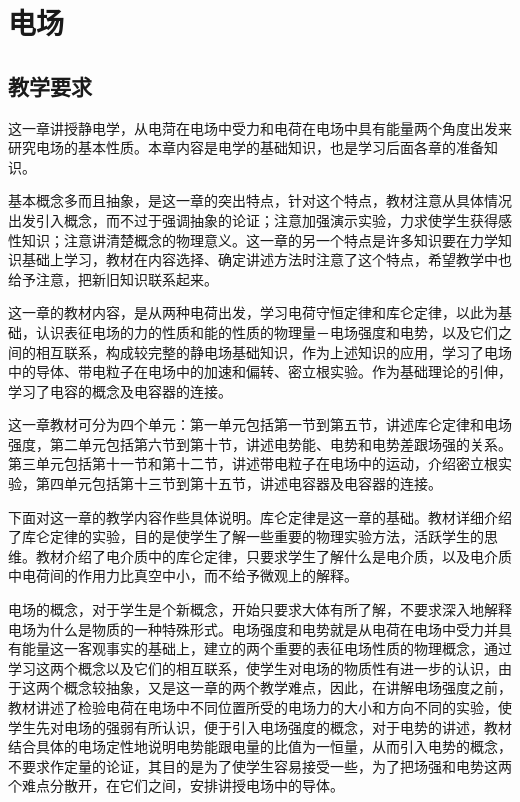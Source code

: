 \chapter{电场}\minitoc[n]
\section{教学要求}
这一章讲授静电学，从电菏在电场中受力和电荷在电场中具有能量两个角度出发来研究电场的基本性质。本章内容是电学的基础知识，也是学习后面各章的准备知识。

基本概念多而且抽象，是这一章的突出特点，针对这个特点，教材注意从具体情况出发引入概念，而不过于强调抽象的论证；注意加强演示实验，力求使学生获得感性知识；注意讲清楚概念的物理意义。这一章的另一个特点是许多知识要在力学知识基础上学习，教材在内容选择、确定讲述方法时注意了这个特点，希望教学中也给予注意，把新旧知识联系起来。

这一章的教材内容，是从两种电荷出发，学习电荷守恒定律和库仑定律，以此为基础，认识表征电场的力的性质和能的性质的物理量－电场强度和电势，以及它们之间的相互联系，构成较完整的静电场基础知识，作为上述知识的应用，学习了电场中的导体、带电粒子在电场中的加速和偏转、密立根实验。作为基础理论的引伸，学习了电容的概念及电容器的连接。

这一章教材可分为四个单元：第一单元包括第一节到第五节，讲述库仑定律和电场强度，第二单元包括第六节到第十节，讲述电势能、电势和电势差跟场强的关系。第三单元包括第十一节和第十二节，讲述带电粒子在电场中的运动，介绍密立根实验，第四单元包括第十三节到第十五节，讲述电容器及电容器的连接。

下面对这一章的教学内容作些具体说明。库仑定律是这一章的基础。教材详细介绍了库仑定律的实验，目的是使学生了解一些重要的物理实验方法，活跃学生的思维。教材介绍了电介质中的库仑定律，只要求学生了解什么是电介质，以及电介质中电荷间的作用力比真空中小，而不给予微观上的解释。

电场的概念，对于学生是个新概念，开始只要求大体有所了解，不要求深入地解释电场为什么是物质的一种特殊形式。电场强度和电势就是从电荷在电场中受力并具有能量这一客观事实的基础上，建立的两个重要的表征电场性质的物理概念，通过学习这两个概念以及它们的相互联系，使学生对电场的物质性有进一步的认识，由于这两个概念较抽象，又是这一章的两个教学难点，因此，在讲解电场强度之前，教材讲述了检验电荷在电场中不同位置所受的电场力的大小和方向不同的实验，使学生先对电场的强弱有所认识，便于引入电场强度的概念，对于电势的讲述，教材结合具体的电场定性地说明电势能跟电量的比值为一恒量，从而引入电势的概念，不要求作定量的论证，其目的是为了使学生容易接受一些，为了把场强和电势这两个难点分散开，在它们之间，安排讲授电场中的导体。

